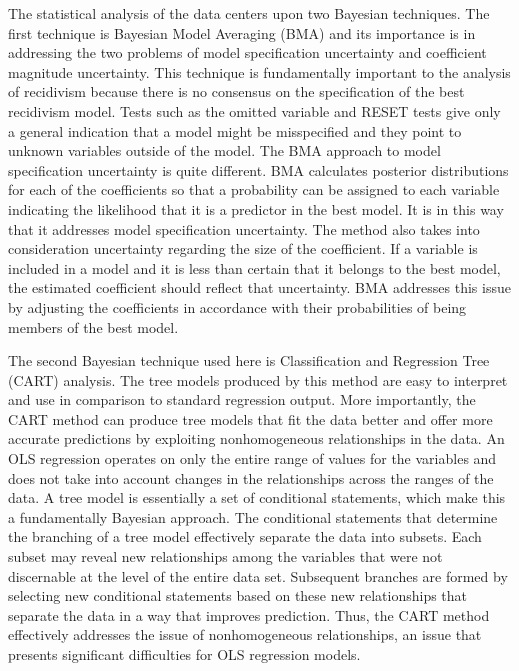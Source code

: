 The statistical analysis of the data centers upon two Bayesian techniques.  The first technique is Bayesian Model Averaging (BMA) and its importance is in addressing the two problems of model specification uncertainty and coefficient magnitude uncertainty.  This technique is fundamentally important to the analysis of recidivism because there is no consensus on the specification of the best recidivism model.  Tests such as the omitted variable and RESET tests give only a general indication that a model might be misspecified and they point to unknown variables outside of the model.  The BMA approach to model specification uncertainty is quite different.  BMA calculates posterior distributions for each of the coefficients so that a probability can be assigned to each variable indicating the likelihood that it is a predictor in the best model.  It is in this way that it addresses model specification uncertainty.  The method also takes into consideration uncertainty regarding the size of the coefficient.  If a variable is included in a model and it is less than certain that it belongs to the best model, the estimated coefficient should reflect that uncertainty.  BMA addresses this issue by adjusting the coefficients in accordance with their probabilities of being members of the best model.

The second Bayesian technique used here is Classification and Regression Tree (CART) analysis.  The tree models produced by this method are easy to interpret and use in comparison to standard regression output.  More importantly, the CART method can produce tree models that fit the data better and offer more accurate predictions by exploiting nonhomogeneous relationships in the data.  An OLS regression operates on only the entire range of values for the variables and does not take into account changes in the relationships across the ranges of the data.  A tree model is essentially a set of conditional statements, which make this a fundamentally Bayesian approach.  The conditional statements that determine the branching of a tree model effectively separate the data into subsets.  Each subset may reveal new relationships among the variables that were not discernable at the level of the entire data set. Subsequent branches are formed by selecting new conditional statements based on these new relationships that separate the data in a way that improves prediction.  Thus, the CART method effectively addresses the issue of nonhomogeneous relationships, an issue that presents significant difficulties for OLS regression models.


